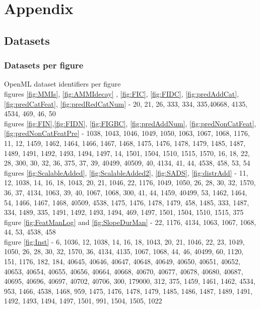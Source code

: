 \documentclass[a4paper,10pt]{article}
\begin{document}
\section{Appendix}
\subsection{Datasets}
\subsubsection{Datasets per figure}
OpenML dataset identifiers per figure \\

figures \ref{fig:MMIs}, \ref{fig:AMMIdecay} , \ref{fig:FIC}, \ref{fig:FIDC}, \ref{fig:predAddCat}, \ref{fig:predCatFeat}, \ref{fig:predRedCatNum}  - 20, 21, 26, 333, 334, 335,40668, 4135, 4534, 469, 46, 50 \\
figures \ref{fig:FIN},\ref{fig:FIDN}, \ref{fig:FIGBC}, \ref{fig:predAddNum}, \ref{fig:predNonCatFeat}, \ref{fig:predNonCatFeatPre} - 1038, 1043, 1046, 1049, 1050, 1063, 1067, 1068, 1176, 11, 12, 1459, 1462, 1464, 1466, 1467, 1468, 1475, 1476, 1478, 1479, 1485, 1487, 1489, 1491, 1492, 1493, 1494, 1497, 14, 1501, 1504, 1510, 1515, 1570, 16, 18, 22, 28, 300, 30, 32, 36, 375, 37, 39, 40499, 40509, 40, 4134, 41, 44, 4538, 458, 53, 54 \\
figures \ref{fig:ScalableAdded}, \ref{fig:ScalableAdded2}, \ref{fig:SADS}, \ref{fig:distrAdd} - 11, 12, 1038, 14, 16, 18, 1043, 20, 21, 1046, 22, 1176, 1049, 1050, 26, 28, 30, 32, 1570, 36, 37, 4134, 1063, 39, 40, 1067, 1068, 300, 41, 44, 1459, 40499, 53, 1462, 1464, 54, 1466, 1467, 1468, 40509, 4538, 1475, 1476, 1478, 1479, 458, 1485, 333, 1487, 334, 1489, 335, 1491, 1492, 1493, 1494, 469, 1497, 1501, 1504, 1510, 1515, 375 \\
figure \ref{fig:FeatManLog} and \ref{fig:SlopeDurMan}  - 22, 1176, 4134, 1063, 1067, 1068, 44, 53, 4538, 458 \\
figure \ref{fig:Inst} - 6, 1036, 12, 1038, 14, 16, 18, 1043, 20, 21, 1046, 22, 23, 1049, 1050, 26, 28, 30, 32, 1570, 36, 4134, 4135, 1067, 1068, 44, 46, 40499, 60, 1120, 151, 1176, 182, 184, 40645, 40646, 40647, 40648, 40649, 40650, 40651, 40652, 40653, 40654, 40655, 40656, 40664, 40668, 40670, 40677, 40678, 40680, 40687, 40695, 40696, 40697, 40702, 40706, 300, 179000, 312, 375, 1459, 1461, 1462, 4534, 953, 1466, 4538, 1468, 959, 1475, 1476, 1478, 1479, 1485, 1486, 1487, 1489, 1491, 1492, 1493, 1494, 1497, 1501, 991, 1504, 1505, 1022 \\
\end{document}
